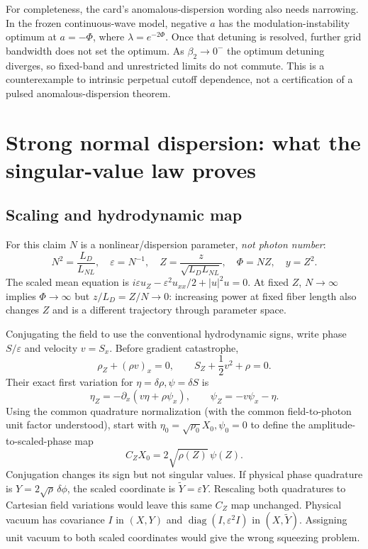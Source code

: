 \documentclass[11pt,a4paper]{article}
\newcommand{\eps}{\varepsilon}
\begin{document}
For completeness, the card's anomalous-dispersion wording also needs narrowing. In the frozen continuous-wave model, negative $a$ has the modulation-instability optimum at $a=-\Phi$, where $\lambda=e^{-2\Phi}$. Once that detuning is resolved, further grid bandwidth does not set the optimum. As $\beta_2\to0^-$ the optimum detuning diverges, so fixed-band and unrestricted limits do not commute. This is a counterexample to intrinsic perpetual cutoff dependence, not a certification of a pulsed anomalous-dispersion theorem.

\section{Strong normal dispersion: what the singular-value law proves}

\subsection{Scaling and hydrodynamic map}

For this claim $N$ is a nonlinear/dispersion parameter, \emph{not photon number}:
\begin{equation}
N^2=\frac{L_D}{L_{NL}},\quad \eps=N^{-1},\quad
Z=\frac z{\sqrt{L_DL_{NL}}},\quad \Phi=NZ,\quad y=Z^2.
\end{equation}
The scaled mean equation is $i\eps u_Z-\eps^2u_{xx}/2+|u|^2u=0$. At fixed $Z$, $N\to\infty$ implies $\Phi\to\infty$ but $z/L_D=Z/N\to0$: increasing power at fixed fiber length also changes $Z$ and is a different trajectory through parameter space.

Conjugating the field to use the conventional hydrodynamic signs, write phase $S/\eps$ and velocity $v=S_x$. Before gradient catastrophe,
\begin{equation}
\rho_Z+(\rho v)_x=0,\qquad S_Z+\frac12v^2+\rho=0.
\end{equation}
Their exact first variation for $\eta=\delta\rho,\psi=\delta S$ is
\begin{equation}
\eta_Z=-\partial_x(v\eta+\rho\psi_x),\qquad
\psi_Z=-v\psi_x-\eta.
\end{equation}
Using the common quadrature normalization (with the common field-to-photon unit factor understood), start with $\eta_0=\sqrt{\rho_0}X_0,\psi_0=0$ to define the amplitude-to-scaled-phase map
\begin{equation}
C_ZX_0=2\sqrt{\rho(Z)}\,\psi(Z).
\end{equation}
Conjugation changes its sign but not singular values. If physical phase quadrature is $Y=2\sqrt\rho\,\delta\phi$, the scaled coordinate is $\widetilde Y=\eps Y$. Rescaling both quadratures to Cartesian field variations would leave this same $C_Z$ map unchanged. Physical vacuum has covariance $I$ in $(X,Y)$ and $\operatorname{diag}(I,\eps^2I)$ in $(X,\widetilde Y)$. Assigning unit vacuum to both scaled coordinates would give the wrong squeezing problem.
\end{document}
